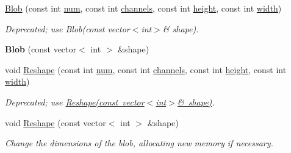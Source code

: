 \begin{DoxyCompactItemize}
\item 
\mbox{\label{classcaffe_1_1_blob_a379df830aad9b3cae253e1ddb0863844}} 
\mbox{\hyperlink{classcaffe_1_1_blob_a379df830aad9b3cae253e1ddb0863844}{Blob}} (const int \mbox{\hyperlink{classcaffe_1_1_blob_a80ed3eddf98ffd408e9a627b1a7c2a9e}{num}}, const int \mbox{\hyperlink{classcaffe_1_1_blob_ae48c8e9f0a0b66b041e47bf37ed04471}{channels}}, const int \mbox{\hyperlink{classcaffe_1_1_blob_a18af535af43f4e9f85bd1e520886276f}{height}}, const int \mbox{\hyperlink{classcaffe_1_1_blob_afbdc067c69e6b9bd6880a73c13db2ec6}{width}})
\begin{DoxyCompactList}\small\item\em Deprecated; use {\ttfamily Blob(const vector$<$int$>$\& shape)}. \end{DoxyCompactList}\item 
\mbox{\label{classcaffe_1_1_blob_a2268ef004df012760d300465a28f0f68}} 
{\bfseries Blob} (const vector$<$ int $>$ \&shape)
\item 
\mbox{\label{classcaffe_1_1_blob_ad0e0a9a4f49478e89161c6afe4e341a0}} 
void \mbox{\hyperlink{classcaffe_1_1_blob_ad0e0a9a4f49478e89161c6afe4e341a0}{Reshape}} (const int \mbox{\hyperlink{classcaffe_1_1_blob_a80ed3eddf98ffd408e9a627b1a7c2a9e}{num}}, const int \mbox{\hyperlink{classcaffe_1_1_blob_ae48c8e9f0a0b66b041e47bf37ed04471}{channels}}, const int \mbox{\hyperlink{classcaffe_1_1_blob_a18af535af43f4e9f85bd1e520886276f}{height}}, const int \mbox{\hyperlink{classcaffe_1_1_blob_afbdc067c69e6b9bd6880a73c13db2ec6}{width}})
\begin{DoxyCompactList}\small\item\em Deprecated; use {\ttfamily \mbox{\hyperlink{classcaffe_1_1_blob_ac9ce456aa623ff3f4d24225a0db14404}{Reshape(const vector$<$int$>$\& shape)}}}. \end{DoxyCompactList}\item 
void \mbox{\hyperlink{classcaffe_1_1_blob_ac9ce456aa623ff3f4d24225a0db14404}{Reshape}} (const vector$<$ int $>$ \&shape)
\begin{DoxyCompactList}\small\item\em Change the dimensions of the blob, allocating new memory if necessary. \end{DoxyCompactList}\item 

\end{DoxyCompactItemize}
